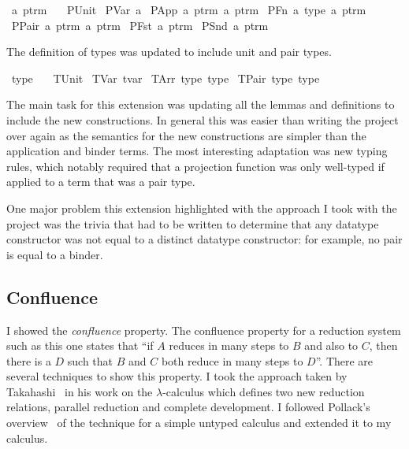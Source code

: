 \begin{implementation}
\isamarkupfalse%
\ {\isacharprime}a\ ptrm\ {\isacharequal}\isanewline
\ \ PUnit\isanewline
{\isacharbar}\ PVar\ {\isacharprime}a\isanewline
{\isacharbar}\ PApp\ {\isachardoublequoteopen}{\isacharprime}a\ ptrm{\isachardoublequoteclose}\ {\isachardoublequoteopen}{\isacharprime}a\ ptrm{\isachardoublequoteclose}\isanewline
{\isacharbar}\ PFn\ {\isacharprime}a\ type\ {\isachardoublequoteopen}{\isacharprime}a\ ptrm{\isachardoublequoteclose}\isanewline
{\isacharbar}\ PPair\ {\isachardoublequoteopen}{\isacharprime}a\ ptrm{\isachardoublequoteclose}\ {\isachardoublequoteopen}{\isacharprime}a\ ptrm{\isachardoublequoteclose}\isanewline
{\isacharbar}\ PFst\ {\isachardoublequoteopen}{\isacharprime}a\ ptrm{\isachardoublequoteclose}\isanewline
{\isacharbar}\ PSnd\ {\isachardoublequoteopen}{\isacharprime}a\ ptrm{\isachardoublequoteclose}
\end{implementation}

The definition of types was updated to include unit and pair types.

\begin{implementation}
\isamarkupfalse%
\ type\ {\isacharequal}\isanewline
\ \ TUnit\isanewline
{\isacharbar}\ TVar\ tvar\isanewline
{\isacharbar}\ TArr\ type\ type\isanewline
{\isacharbar}\ TPair\ type\ type
\end{implementation}

The main task for this extension was updating all the lemmas and definitions to include the new constructions.
In general this was easier than writing the project over again as the semantics for the new constructions are simpler than the application and binder terms.
The most interesting adaptation was new typing rules, which notably required that a projection function was only well-typed if applied to a term that was a pair type.

One major problem this extension highlighted with the approach I took with the project was the trivia that had to be written to determine that any datatype constructor was not equal to a distinct datatype constructor: for example, no pair is equal to a binder.

\subsection{Confluence}
\label{sec:confluence}
I showed the \emph{confluence} property.
The confluence property for a reduction system such as this one states that ``if \(A\) reduces in many steps to \(B\) and also to \(C\), then there is a \(D\) such that \(B\) and \(C\) both reduce in many steps to \(D\)''.
There are several techniques to show this property.
I took the approach taken by Takahashi~\cite{Takahashi} in his work on the \(\lambda\)-calculus which defines two new reduction relations, parallel reduction and complete development.
I followed Pollack's overview~\cite{pollack} of the technique for a simple untyped calculus and extended it to my calculus.

